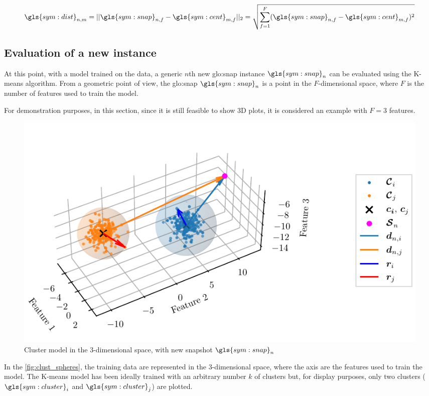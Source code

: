\begin{equation}
  \label{eq:clust_dist}
  \gls{sym:dist}_{n,m} = ||\gls{sym:snap}_{n,f} - \gls{sym:cent}_{m,f}||_2 = \sqrt{\sum_{f=1}^{F} (\gls{sym:snap}_{n,f} - \gls{sym:cent}_{m,f})^2}
\end{equation}

\subsection{Evaluation of a new instance}

At this point, with a model trained on the data, a generic $n$th new {\gls{glo:snap}} instance $\gls{sym:snap}_n$ can be evaluated using the K-means algorithm.
From a geometric point of view, the {\gls{glo:snap}} $\gls{sym:snap}_n$ is a point in the ${F}$-dimensional space, where ${F}$ is the number of features used to train the model.

For demonstration purposes, in this section, since it is still feasible to show 3D plots, it is considered an example with ${F}=3$ features.

\begin{figure}[htbp]
  \centering
  \includegraphics[width=\textwidth]{images/Spheres_2.pdf}
  \caption{Cluster model in the $3$-dimensional space, with new snapshot $\gls{sym:snap}_n$}
  \label{fig:clust_spheres}
\end{figure}

In the \autoref{fig:clust_spheres}, the training data are represented in the $3$-dimensional space, where the axis are the features used to train the model. The K-means model has been ideally trained with an arbitrary number $k$ of clusters but, for display purposes, only two clusters  ($\gls{sym:cluster}_i$ and $\gls{sym:cluster}_j$) are plotted.
